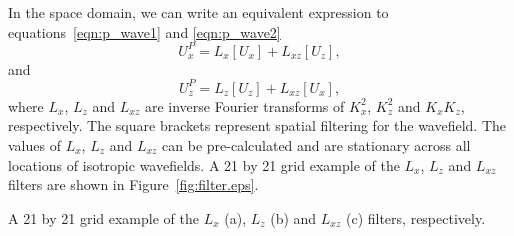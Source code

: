 \documentclass[manuscript,ulem,graphix,revised]{geophysics}
\begin{document}
In the space domain, we can write an equivalent expression to equations~\ref{eqn:p_wave1} and \ref{eqn:p_wave2}
\begin{equation}
U^P_x = L_x [U_x] + L_{xz} [U_z],
\label{eqn:p_space1}
\end{equation}
and 
\begin{equation}
U^P_z = L_z [U_z] + L_{xz} [U_x],
\label{eqn:p_space2}
\end{equation}
where $L_x$, $L_z$ and $L_{xz}$ are inverse Fourier transforms of $K^2_x$, $K^2_z$ and $K_xK_z$, respectively. The square brackets represent spatial filtering for the wavefield. The values of $L_x$, $L_z$ and $L_{xz}$ can  be pre-calculated and are stationary across all locations of isotropic wavefields. A 21 by 21 grid example of the $L_x$, $L_z$ and $L_{xz}$ filters are shown in Figure~\ref{fig:filter.eps}.

{
A 21 by 21 grid example of the $L_x$ (a), $L_z$ (b) and $L_{xz}$ (c) filters, respectively.
}



\end{document}
